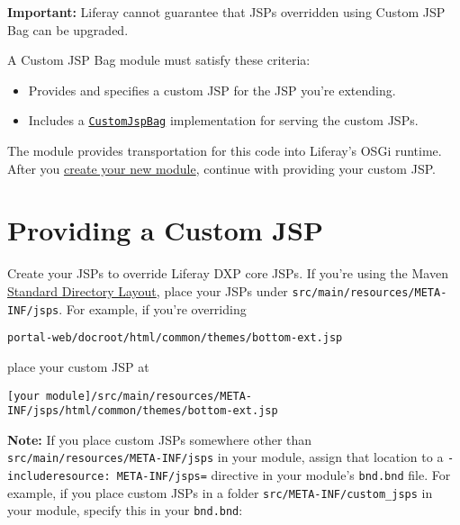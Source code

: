 \noindent\hrulefill

\textbf{Important:} Liferay cannot guarantee that JSPs overridden using
Custom JSP Bag can be upgraded.

\noindent\hrulefill

A Custom JSP Bag module must satisfy these criteria:

\begin{itemize}
\item
  Provides and specifies a custom JSP for the JSP you're extending.
\item
  Includes a
  \href{https://docs.liferay.com/dxp/portal/7.2-latest/javadocs/portal-impl/com/liferay/portal/deploy/hot/CustomJspBag.html}{\texttt{CustomJspBag}}
  implementation for serving the custom JSPs.
\end{itemize}

The module provides transportation for this code into Liferay's OSGi
runtime. After you
\href{/docs/7-2/reference/-/knowledge_base/r/creating-a-project}{create
your new module}, continue with providing your custom JSP.

\section{Providing a Custom JSP}\label{providing-a-custom-jsp}

Create your JSPs to override Liferay DXP core JSPs. If you're using the
Maven
\href{https://maven.apache.org/guides/introduction/introduction-to-the-standard-directory-layout.html}{Standard
Directory Layout}, place your JSPs under
\texttt{src/main/resources/META-INF/jsps}. For example, if you're
overriding

\begin{verbatim}
portal-web/docroot/html/common/themes/bottom-ext.jsp 
\end{verbatim}

place your custom JSP at

\begin{verbatim}
[your module]/src/main/resources/META-INF/jsps/html/common/themes/bottom-ext.jsp
\end{verbatim}

\noindent\hrulefill

\textbf{Note:} If you place custom JSPs somewhere other than
\texttt{src/main/resources/META-INF/jsps} in your module, assign that
location to a \texttt{-includeresource:\ META-INF/jsps=} directive in
your module's \texttt{bnd.bnd} file. For example, if you place custom
JSPs in a folder \texttt{src/META-INF/custom\_jsps} in your module,
specify this in your \texttt{bnd.bnd}:

